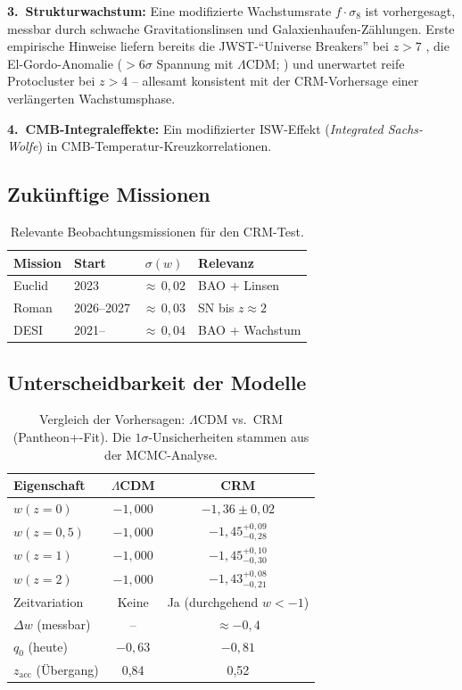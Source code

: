 \documentclass[aps,prd,twocolumn,superscriptaddress,nofootinbib]{revtex4-2}
\begin{document}
\textbf{3.~Strukturwachstum:} Eine modifizierte Wachstumsrate $f \cdot \sigma_8$ ist vorhergesagt, messbar durch schwache Gravitationslinsen und Galaxienhaufen-Z\"ahlungen. Erste empirische Hinweise liefern bereits die JWST-``Universe Breakers'' bei $z > 7$ \cite{Labbe2023}, die El-Gordo-Anomalie ($> 6\sigma$ Spannung mit $\Lambda$CDM; \cite{Asencio2023}) und unerwartet reife Protocluster bei $z > 4$ \cite{Miller2018} -- allesamt konsistent mit der CRM-Vorhersage einer verl\"angerten Wachstumsphase.

\textbf{4.~CMB-Integraleffekte:} Ein modifizierter ISW-Effekt (\textit{Integrated Sachs-Wolfe}) in CMB-Temperatur-Kreuzkorrelationen.

\subsection{Zuk\"unftige Missionen}

\begin{table}[H]
\centering
\caption{Relevante Beobachtungsmissionen f\"ur den CRM-Test.}
\label{tab:missionen}
\small
\begin{tabular}{llcl}
\toprule
\textbf{Mission} & \textbf{Start} & $\sigma(w)$ & \textbf{Relevanz} \\
\midrule
Euclid & 2023 & ${\approx}\,0{,}02$ & BAO + Linsen \\
Roman & 2026--2027 & ${\approx}\,0{,}03$ & SN bis $z \approx 2$ \\
DESI & 2021-- & ${\approx}\,0{,}04$ & BAO + Wachstum \\
\bottomrule
\end{tabular}
\end{table}

\subsection{Unterscheidbarkeit der Modelle}

\begin{table}[H]
\centering
\caption{Vergleich der Vorhersagen: $\Lambda$CDM vs.\ CRM (Pantheon+-Fit). Die $1\sigma$-Unsicherheiten stammen aus der MCMC-Analyse.}
\label{tab:vorhersagen}
\begin{tabular}{lcc}
\toprule
\textbf{Eigenschaft} & $\Lambda$CDM & CRM \\
\midrule
$w(z{=}0)$ & $-1{,}000$ & $-1{,}36 \pm 0{,}02$ \\
$w(z{=}0{,}5)$ & $-1{,}000$ & $-1{,}45^{+0{,}09}_{-0{,}28}$ \\
$w(z{=}1)$ & $-1{,}000$ & $-1{,}45^{+0{,}10}_{-0{,}30}$ \\
$w(z{=}2)$ & $-1{,}000$ & $-1{,}43^{+0{,}08}_{-0{,}21}$ \\
Zeitvariation & Keine & Ja (durchgehend $w < -1$) \\
$\Delta w$ (messbar) & -- & $\approx -0{,}4$ \\
$q_0$ (heute) & $-0{,}63$ & $-0{,}81$ \\
$z_{\mathrm{acc}}$ (\"Ubergang) & 0,84 & 0,52 \\
\bottomrule
\end{tabular}
\end{table}
\end{document}

